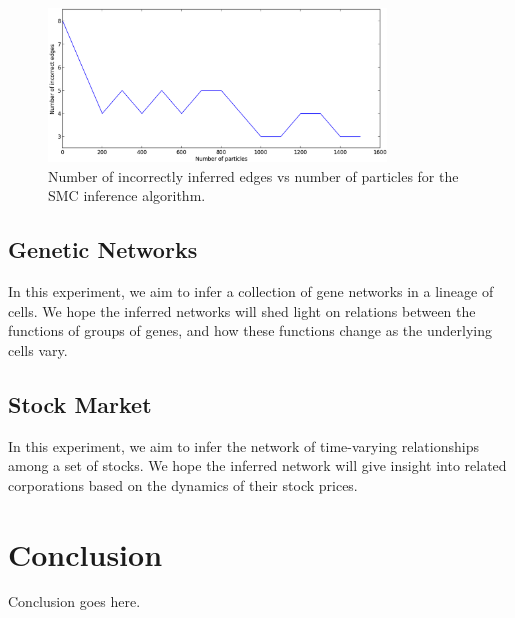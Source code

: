 \documentclass{article}
\begin{document}
\begin{figure}[h!tbp]
  \centering               
  \includegraphics[width=0.8\textwidth]{fig/errorVsNumParticles.png}
  \caption{Number of incorrectly inferred edges vs number of particles for the SMC inference algorithm.}
  \label{fig:errorVsParticles}
\end{figure}


\subsection{Genetic Networks}
In this experiment, we aim to infer a collection of gene networks in a lineage of cells. We hope the inferred networks will shed light on relations between the functions of groups of genes, and how these functions change as the underlying cells vary.


\subsection{Stock Market}
In this experiment, we aim to infer the network of time-varying relationships among a set of stocks. We hope the inferred network will give insight into related corporations based on the dynamics of their stock prices.


\section{Conclusion}
\label{sec:conclusion}

Conclusion goes here.
\end{document}
